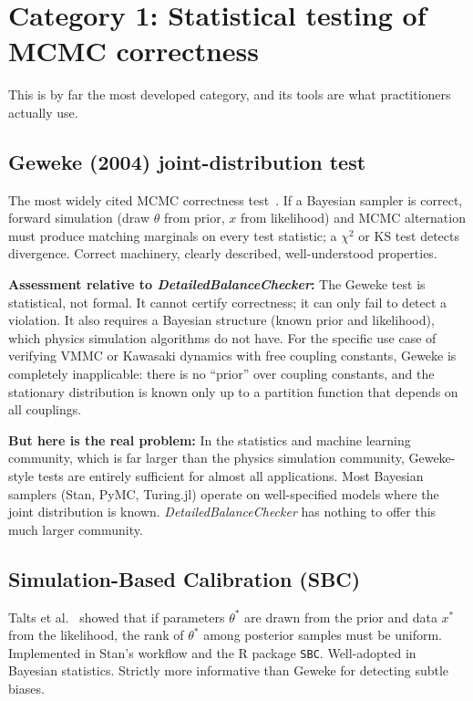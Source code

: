 \documentclass[11pt,a4paper]{article}
\newcommand{\DBC}{\textit{DetailedBalanceChecker}}
\begin{document}
\section{Category 1: Statistical testing of MCMC correctness}
\label{sec:statistical}

This is by far the most developed category, and its tools are what practitioners
actually use.

\subsection{Geweke (2004) joint-distribution test}

The most widely cited MCMC correctness test~\cite{Geweke2004}.  If a Bayesian
sampler is correct, forward simulation (draw $\theta$ from prior, $x$ from
likelihood) and MCMC alternation must produce matching marginals on every test
statistic; a $\chi^2$ or KS test detects divergence.  Correct machinery, clearly
described, well-understood properties.

\textbf{Assessment relative to \DBC{}:}  The Geweke test is statistical, not
formal.  It cannot certify correctness; it can only fail to detect a violation.
It also requires a Bayesian structure (known prior and likelihood), which physics
simulation algorithms do not have.  For the specific use case of verifying VMMC or
Kawasaki dynamics with free coupling constants, Geweke is completely inapplicable:
there is no ``prior'' over coupling constants, and the stationary distribution is
known only up to a partition function that depends on all couplings.

\textbf{But here is the real problem:}  In the statistics and machine learning
community, which is far larger than the physics simulation community, Geweke-style
tests are entirely sufficient for almost all applications.  Most Bayesian samplers
(Stan, PyMC, Turing.jl) operate on well-specified models where the joint
distribution is known.  \DBC{} has nothing to offer this much larger community.

\subsection{Simulation-Based Calibration (SBC)}

Talts et al.~\cite{Talts2018} showed that if parameters $\theta^*$ are drawn from
the prior and data $x^*$ from the likelihood, the rank of $\theta^*$ among
posterior samples must be uniform.  Implemented in Stan's workflow and the R
package \texttt{SBC}.  Well-adopted in Bayesian statistics.  Strictly more
informative than Geweke for detecting subtle biases.
\end{document}
